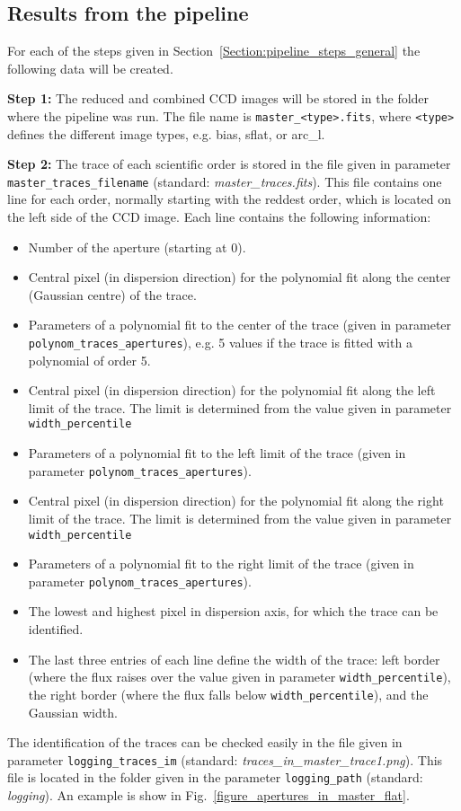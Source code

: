 \documentclass[10pt,a4paper]{article}
\begin{document}
\subsection{Results from the pipeline}
\label{section:results_pipeline}
For each of the steps given in Section~\ref{Section:pipeline_steps_general} the following data will be created.

\noindent \textbf{Step 1:} The reduced and combined CCD images will be stored in the folder where the pipeline was run. The file name is \verb|master_<type>.fits|, where \verb|<type>| defines the different image types, e.g. bias, sflat, or arc\_l.

\vspace{0.5em}\noindent \textbf{Step 2:} The trace of each scientific order is stored in the file given in parameter \verb|master_traces_filename| (standard: \textit{master\_traces.fits}). This file contains one line for each order, normally starting with the reddest order, which is located on the left side of the CCD image. Each line contains the following information:
\begin{itemize}\setlength\itemsep{0em}
  \item Number of the aperture (starting at 0).
  \item Central pixel (in dispersion direction) for the polynomial fit along the center (Gaussian centre) of the trace.
  \item Parameters of a polynomial fit to the center of the trace (given in parameter \verb|polynom_traces_apertures|), e.g. 5 values if the trace is fitted with a polynomial of order 5.
  \item Central pixel (in dispersion direction) for the polynomial fit along the left limit of the trace. The limit is determined from the value given in parameter \verb|width_percentile|
  \item Parameters of a polynomial fit to the left limit of the trace (given in parameter \verb|polynom_traces_apertures|).
  \item Central pixel (in dispersion direction) for the polynomial fit along the right limit of the trace. The limit is determined from the value given in parameter \verb|width_percentile|
  \item Parameters of a polynomial fit to the right limit of the trace (given in parameter \verb|polynom_traces_apertures|).
  \item The lowest and highest pixel in dispersion axis, for which the trace can be identified.
  \item The last three entries of each line define the width of the trace: left border (where the flux raises over the value given in parameter \verb|width_percentile|), the right border (where the flux falls below \verb|width_percentile|), and the Gaussian width.
\end{itemize}
The identification of the traces can be checked easily in the file given in parameter \verb|logging_traces_im| (standard: \textit{traces\_in\_master\_trace1.png}). This file is located in the folder given in the parameter \verb|logging_path| (standard: \textit{logging}). An example is show in Fig.~\ref{figure_apertures_in_master_flat}.
\end{document}
